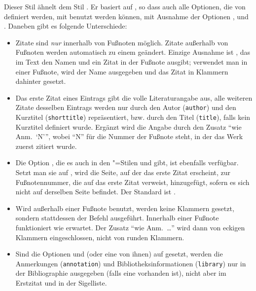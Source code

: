 \documentclass[ngerman]{scrartcl}
\begin{document}
Dieser Stil ähnelt dem Stil . Er basiert auf
, so dass auch alle Optionen, die von  definiert 
werden, mit  benutzt werden können, mit Ausnahme der Optionen 
,  und . Daneben gibt es folgende 
Unterschiede:
\medskip
\begin{itemize}
	\item Zitate sind \emph{nur} innerhalb von Fußnoten möglich. Zitate
	      außerhalb von Fußnoten werden automatisch zu einem 
	      geändert. Einzige Ausnahme ist , das im Text den
	      Namen und ein Zitat in der Fußnote ausgibt; verwendet man 
	       in einer Fußnote, wird der Name ausgegeben und
	      das Zitat in Klammern dahinter gesetzt.
	\item Das erste Zitat eines Eintrags gibt die volle Literaturangabe aus, 
	      alle weiteren Zitate desselben Eintrags werden nur durch den
	      Autor (\texttt{author}) und den Kurztitel (\texttt{shorttitle}) 
	      repräsentiert, bzw. durch den Titel (\texttt{title}), falls kein
	      Kurztitel definiert wurde. Ergänzt wird die Angabe durch den
	      Zusatz \enquote{wie Anm.~\enquote{N}}, wobei \enquote{N} für
	      die Nummer der Fußnote steht, in der das Werk zuerst zitiert
	      wurde.
	\item Die
	      Option , die es auch in den \bl"=Stilen 
	       und  gibt, ist ebenfalls
	      verfügbar. Setzt man sie auf , wird die Seite, auf der
	      das erste Zitat erscheint, zur Fußnotennummer, die auf das erste
	      Zitat verweist, hinzugefügt, sofern es sich nicht auf derselben
	      Seite befindet. Der Standard ist .
	\item Wird  außerhalb einer Fußnote benutzt, werden keine
	      Klammern gesetzt, sondern stattdessen der Befehl  
	      ausgeführt. Innerhalb einer Fußnote funktioniert 
	      wie erwartet. Der Zusatz \enquote{wie Anm.~\ldots} wird dann von
	      eckigen Klammern eingeschlossen, nicht von runden Klammern.     
	\item Sind die Optionen  und  (oder eine
	      von ihnen) auf  gesetzt, werden die Anmerkungen 
	      (\texttt{annotation}) und Bibliotheksinformationen (\texttt{library})
	      nur in der Bibliographie ausgegeben (falls eine vorhanden ist), nicht
	      aber im Erstzitat und in der Sigelliste.
\end{itemize}
\end{document}
